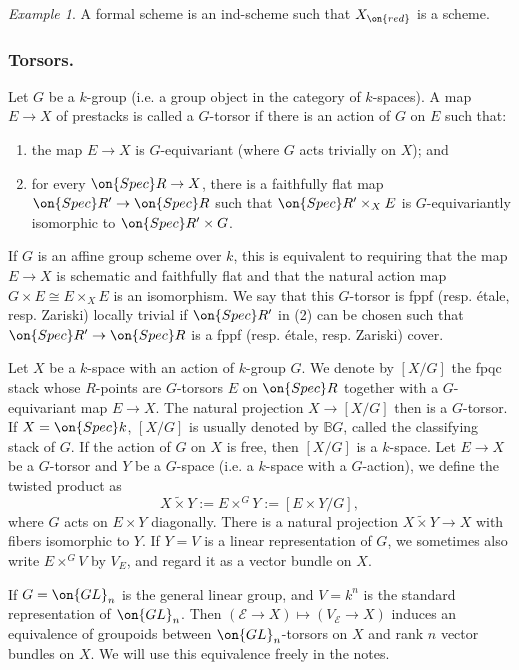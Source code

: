 \documentclass[]{pcmi}
\theoremstyle{plain}
\theoremstyle{remark}
\newtheorem{ex}[equation]{Example}
\theoremstyle{definition}
\newcommand{\bB}{{\mathbb B}}
\newcommand{\mE}{{\mathcal E}}
\newcommand{\Spec}{\on{Spec}}
\newcommand{\GL}{{\on{GL}}}
\begin{document}
\begin{ex}A formal scheme is an ind-scheme such that $X_{\on{red}}$ is
a scheme.
\end{ex}

\subsubsection{Torsors.}\label{Intro:torsor}
Let $G$ be a $k$-group (i.e. a group object in the category of $k$-spaces). A map $E\to X$ of prestacks is called a $G$-torsor if there is an action of $G$ on $E$ such that: 
\begin{enumerate}
\item the map $E\to X$ is $G$-equivariant (where $G$ acts trivially on $X$); and
\item for every $\Spec R\to X$, there is a faithfully flat map $\Spec R'\to \Spec R$ such that $\Spec R'\times_XE$ is $G$-equivariantly isomorphic to $\Spec R'\times G$. 
\end{enumerate}
If $G$ is an affine group scheme over $k$, this is equivalent to requiring that the map $E\to X$ is schematic and faithfully flat and that the natural action map $G\times E\cong E\times_X E$ is an isomorphism. We say that this $G$-torsor is fppf (resp. \'etale, resp. Zariski) locally trivial if $\Spec R'$ in (2) can be chosen such that $\Spec R'\to \Spec R$ is a fppf (resp. \'etale, resp. Zariski) cover.


Let $X$ be a $k$-space with an action of $k$-group $G$. We denote by $[X/G]$ the fpqc stack whose $R$-points are $G$-torsors $E$ on $\Spec R$ together with a $G$-equivariant map $E\to X$. The natural projection $X\to [X/G]$ then is a $G$-torsor. If $X=\Spec k$, $[X/G]$ is usually denoted by $\bB G$, called the classifying stack of $G$. If the action of $G$ on $X$ is free, then $[X/G]$ is a $k$-space. 
Let $E\to X$ be a $G$-torsor and $Y$ be a $G$-space (i.e. a $k$-space with a $G$-action), we define the twisted product as
\[X\tilde\times Y:= E\times^G Y:=[E\times Y/G],\]
where $G$ acts on $E\times Y$ diagonally. There is a natural projection $X\tilde\times Y\to X$ with fibers isomorphic to $Y$. If $Y=V$ is a linear representation of $G$, we sometimes also write $E\times^GV$ by $V_E$, and regard it as a vector bundle on $X$.

If $G=\GL_n$ is the general linear group, and $V=k^n$ is the standard representation of $\GL_n$. Then $(\mE\to X)\mapsto (V_\mE\to X)$ induces an equivalence of groupoids between $\GL_n$-torsors on $X$ and rank $n$ vector bundles on $X$. We will use this equivalence freely in the notes.
\end{document}
